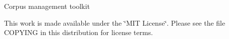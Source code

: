 Corpus management toolkit

This work is made available under the \char`\"{}\-M\-I\-T License\char`\"{}. Please see the file C\-O\-P\-Y\-I\-N\-G in this distribution for license terms. 